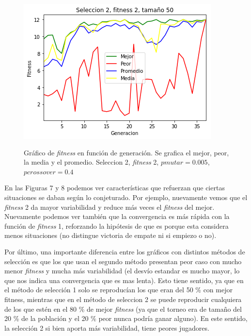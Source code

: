 \documentclass[A4paper,oneside,fleqn,11pt]{article}
\theoremstyle{definition}
\begin{document}
\begin{figure}[H]
	\captionsetup[subfigure]{position=b}
	\centering
		{\includegraphics[width=0.3\linewidth]{s2f2t50.png}}
	\caption{Gráfico de \textit{fitness} en función de generación. Se grafica el mejor, peor, la media y el promedio. Seleccion 2, \textit{fitness} 2, $pmutar=0.005$, $ pcrossover=0.4$}
\end{figure}

En las Figuras 7 y 8 podemos ver características que refuerzan que ciertas situaciones se daban según lo conjeturado. Por ejemplo, nuevamente vemos que el \textit{fitness} 2 da mayor variabilidad y reduce más veces el \textit{fitness} del mejor. Nuevamente podemos ver también que la convergencia es más rápida con la función de \textit{fitness} 1, reforzando la hipótesis de que es porque esta considera menos situaciones (no distingue victoria de empate ni si empiezo o no).

Por último, una importante diferencia entre los gráficos con distintos métodos de selección es que los que usan el segundo método presentan peor caso con mucho menor \textit{fitness} y mucha más variabilidad (el desvío estandar es mucho mayor, lo que nos indica una convergencia que es mas lenta). Esto tiene sentido, ya que en el método de selección 1 solo se reproducían los que eran del 50 \% con mejor fitness, mientras que en el método de seleccion 2 se puede reproducir cualquiera de los que estén en el 80 \% de mejor \textit{fitness} (ya que el torneo era de tamaño del 20 \% de la población y el 20 \% peor nunca podría ganar alguno). En este sentido, la selección 2 si bien aporta más variabilidad, tiene peores jugadores.
\end{document}
